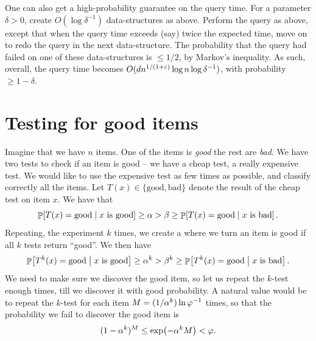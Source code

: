 One can also get a high-probability guarantee on the query time. For a
parameter $\delta > 0$, create $O( \log \delta^{-1})$ \LSH
data-structures as above. Perform the query as above, except that when
the query time exceeds (say) twice the expected time, move on to redo
the query in the next \LSH data-structure. The probability that the
query had failed on one of these \LSH data-structures is
$\leq 1/2$, by Markov's inequality. As such, overall, the query time
becomes $O( d n^{1/(1+{\varepsilon})} \log n \log \delta^{-1})$, with
probability $\geq 1-\delta$.






\section{Testing for good items}

Imagine that we have $n$ items. One of the items is \emph{good} the
rest are \emph{bad}. We have two tests to check if an item is good --
we have a cheap test, a really expensive test. We would like to use
the expensive test as few times as possible, and classify correctly
all the items. Let $T(x) \in \{ \text{good}, \text{bad} \}$ denote the
result of the cheap test on item $x$. We have that
\begin{equation*}
    \mathop{\mathbb{P}}\!\left[ T(x) = \text{good} \;\middle\vert\; x \text{ is good} \right]
    \geq \alpha >
    \beta \geq 
    \mathop{\mathbb{P}}\!\left[ T(x) = \text{good} \;\middle\vert\; x \text{ is bad} \right].    
\end{equation*}
Repeating, the experiment $k$ times, we create a 
where we turn an item is good if all $k$ tests return ``good''. We
then have
\begin{equation*}
    \mathop{\mathbb{P}}\!\left[ T^k(x) = \text{good} \;\middle\vert\; x \text{ is good} \right]
    \geq \alpha^k >
    \beta^k \geq 
    \mathop{\mathbb{P}}\!\left[ T^k(x) = \text{good} \;\middle\vert\; x \text{ is bad} \right].    
\end{equation*}
We need to make sure we discover the good item, so let us repeat the
$k$-test enough times, till we discover it with good probability. A
natural value would be to repeat the $k$-test for each item
$M = (1/\alpha^k ) \ln \varphi^{-1}$ times, so that the probability
we fail to discover the good item is
\begin{equation*}
    (1-\alpha^k)^{M} \leq
    \exp\pth{ -\alpha^k M }
    <
    \BadProb.
\end{equation*}


